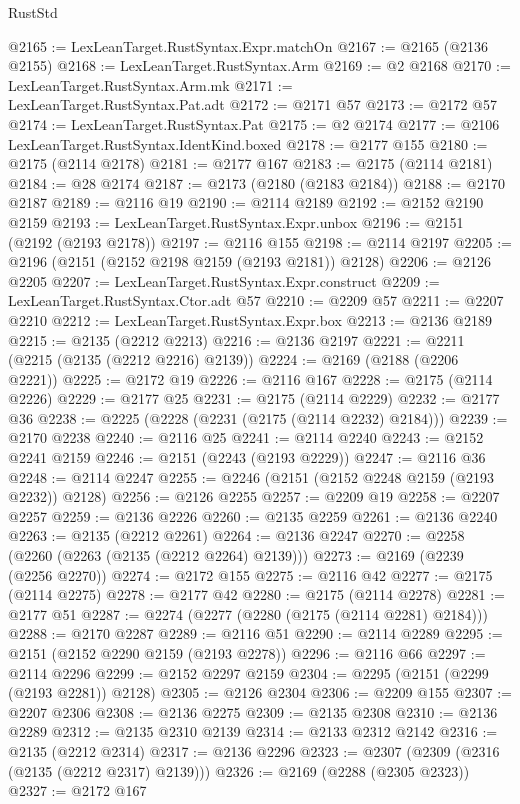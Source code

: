 \begin{lexlean}{RustStd}
\begin{coremodule}
{\begin{coremodule}
{{{{{{{{{{{{{{{{@2165 := LexLeanTarget.RustSyntax.Expr.matchOn
@2167 := @2165 (@2136 @2155)
@2168 := LexLeanTarget.RustSyntax.Arm
@2169 := @2 @2168
@2170 := LexLeanTarget.RustSyntax.Arm.mk
@2171 := LexLeanTarget.RustSyntax.Pat.adt
@2172 := @2171 @57
@2173 := @2172 @57
@2174 := LexLeanTarget.RustSyntax.Pat
@2175 := @2 @2174
@2177 := @2106 LexLeanTarget.RustSyntax.IdentKind.boxed
@2178 := @2177 @155
@2180 := @2175 (@2114 @2178)
@2181 := @2177 @167
@2183 := @2175 (@2114 @2181)
@2184 := @28 @2174
@2187 := @2173 (@2180 (@2183 @2184))
@2188 := @2170 @2187
@2189 := @2116 @19
@2190 := @2114 @2189
@2192 := @2152 @2190 @2159
@2193 := LexLeanTarget.RustSyntax.Expr.unbox
@2196 := @2151 (@2192 (@2193 @2178))
@2197 := @2116 @155
@2198 := @2114 @2197
@2205 := @2196 (@2151 (@2152 @2198 @2159 (@2193 @2181)) @2128)
@2206 := @2126 @2205
@2207 := LexLeanTarget.RustSyntax.Expr.construct
@2209 := LexLeanTarget.RustSyntax.Ctor.adt @57
@2210 := @2209 @57
@2211 := @2207 @2210
@2212 := LexLeanTarget.RustSyntax.Expr.box
@2213 := @2136 @2189
@2215 := @2135 (@2212 @2213)
@2216 := @2136 @2197
@2221 := @2211 (@2215 (@2135 (@2212 @2216) @2139))
@2224 := @2169 (@2188 (@2206 @2221))
@2225 := @2172 @19
@2226 := @2116 @167
@2228 := @2175 (@2114 @2226)
@2229 := @2177 @25
@2231 := @2175 (@2114 @2229)
@2232 := @2177 @36
@2238 := @2225 (@2228 (@2231 (@2175 (@2114 @2232) @2184)))
@2239 := @2170 @2238
@2240 := @2116 @25
@2241 := @2114 @2240
@2243 := @2152 @2241 @2159
@2246 := @2151 (@2243 (@2193 @2229))
@2247 := @2116 @36
@2248 := @2114 @2247
@2255 := @2246 (@2151 (@2152 @2248 @2159 (@2193 @2232)) @2128)
@2256 := @2126 @2255
@2257 := @2209 @19
@2258 := @2207 @2257
@2259 := @2136 @2226
@2260 := @2135 @2259
@2261 := @2136 @2240
@2263 := @2135 (@2212 @2261)
@2264 := @2136 @2247
@2270 := @2258 (@2260 (@2263 (@2135 (@2212 @2264) @2139)))
@2273 := @2169 (@2239 (@2256 @2270))
@2274 := @2172 @155
@2275 := @2116 @42
@2277 := @2175 (@2114 @2275)
@2278 := @2177 @42
@2280 := @2175 (@2114 @2278)
@2281 := @2177 @51
@2287 := @2274 (@2277 (@2280 (@2175 (@2114 @2281) @2184)))
@2288 := @2170 @2287
@2289 := @2116 @51
@2290 := @2114 @2289
@2295 := @2151 (@2152 @2290 @2159 (@2193 @2278))
@2296 := @2116 @66
@2297 := @2114 @2296
@2299 := @2152 @2297 @2159
@2304 := @2295 (@2151 (@2299 (@2193 @2281)) @2128)
@2305 := @2126 @2304
@2306 := @2209 @155
@2307 := @2207 @2306
@2308 := @2136 @2275
@2309 := @2135 @2308
@2310 := @2136 @2289
@2312 := @2135 @2310 @2139
@2314 := @2133 @2312 @2142
@2316 := @2135 (@2212 @2314)
@2317 := @2136 @2296
@2323 := @2307 (@2309 (@2316 (@2135 (@2212 @2317) @2139)))
@2326 := @2169 (@2288 (@2305 @2323))
@2327 := @2172 @167
}}}}}}}}}}}}}}}}
\end{coremodule}}
\end{coremodule}
\end{lexlean}
